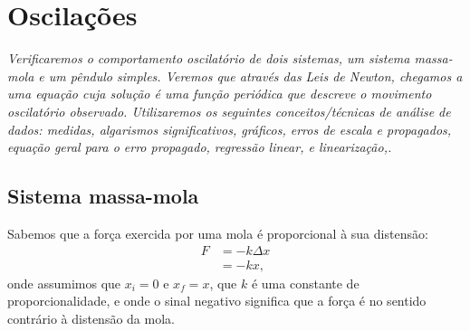 \chapter{Oscilações}
\label{Chap:ExpOscilacoes}

\begin{fullwidth}\it
	Verificaremos o comportamento oscilatório de dois sistemas, um sistema massa-mola e um pêndulo simples. Veremos que através das Leis de Newton, chegamos a uma equação cuja solução é uma função periódica que descreve o movimento oscilatório observado. Utilizaremos os seguintes conceitos/técnicas de análise de dados: medidas, algarismos significativos, gráficos, erros de escala e propagados, equação geral para o erro propagado, regressão linear, e linearização,.
\end{fullwidth}

\section{Sistema massa-mola}

Sabemos que a força exercida por uma mola é proporcional à sua distensão:
\begin{align}
	F &= -k\Delta x \\
	&= -kx,
\end{align}
%
onde assumimos que $x_i = 0$ e $x_f = x$, que $k$ é uma constante de proporcionalidade, e onde o sinal negativo significa que a força é no sentido contrário à distensão da mola.

